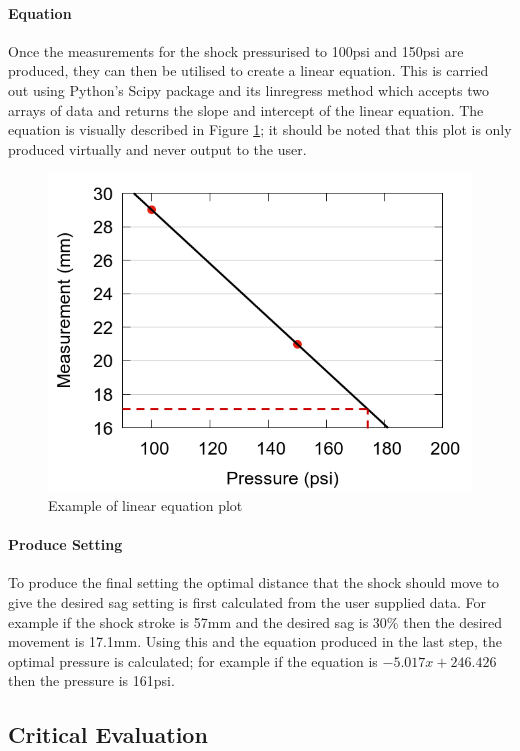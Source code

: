 		\paragraph{Equation}
			Once the measurements for the shock pressurised to 100psi and 150psi are produced, they can then be utilised to create a linear equation. This is carried out using Python's Scipy package and its linregress method which accepts two arrays of data and returns the slope and intercept of the linear equation. The equation is visually described in Figure \ref{fig:equation_plot}; it should be noted that this plot is only produced virtually and never output to the user.
			\begin{figure}[h!]
				\centering
				\includegraphics[scale=0.4]{../images/results/scatter_dotted.png}
				\caption{Example of linear equation plot}
				\label{fig:equation_plot}
			\end{figure}
		\paragraph{Produce Setting}
			To produce the final setting the optimal distance that the shock should move to give the desired sag setting is first calculated from the user supplied data. For example if the shock stroke is 57mm and the desired sag is 30\% then the desired movement is 17.1mm. Using this and the equation produced in the last step, the optimal pressure is calculated; for example if the equation is $-5.017x + 246.426$ then the pressure is 161psi.
\clearpage
\subsection{Critical Evaluation}
